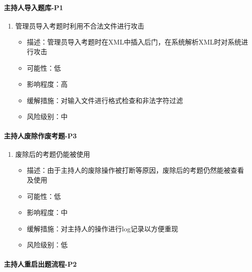 \documentclass[hyperref, a4paper]{ctexart}
\providecommand{\tightlist}{%
  \setlength{\itemsep}{0pt}\setlength{\parskip}{0pt}}
\let\oldparagraph\paragraph
\renewcommand{\paragraph}[1]{\oldparagraph{#1}\mbox{}}
\begin{document}
\hypertarget{ux4e3bux6301ux4ebaux5bfcux5165ux9898ux5e93-p1}{%
\paragraph{主持人导入题库-P1}\label{ux4e3bux6301ux4ebaux5bfcux5165ux9898ux5e93-p1}}

\begin{enumerate}
\def\labelenumi{\arabic{enumi}.}
\tightlist
\item
  管理员导入考题时利用不合法文件进行攻击

  \begin{itemize}
  \tightlist
  \item
    描述：管理员导入考题时在XML中插入后门，在系统解析XML时对系统进行攻击
  \item
    可能性：低
  \item
    影响程度：高
  \item
    缓解措施：对输入文件进行格式检查和非法字符过滤
  \item
    风险级别：中
  \end{itemize}
\end{enumerate}

\hypertarget{ux4e3bux6301ux4ebaux5e9fux9664ux4f5cux5e9fux8003ux9898-p3}{%
\paragraph{主持人废除作废考题-P3}\label{ux4e3bux6301ux4ebaux5e9fux9664ux4f5cux5e9fux8003ux9898-p3}}

\begin{enumerate}
\def\labelenumi{\arabic{enumi}.}
\tightlist
\item
  废除后的考题仍能被使用

  \begin{itemize}
  \tightlist
  \item
    描述：由于主持人的废除操作被打断等原因，废除后的考题仍然能被查看及使用
  \item
    可能性：低
  \item
    影响程度：中
  \item
    缓解措施：对主持人的操作进行log记录以方便重现
  \item
    风险级别：低
  \end{itemize}
\end{enumerate}

\hypertarget{ux4e3bux6301ux4ebaux91cdux542fux51faux9898ux6d41ux7a0b-p2}{%
\paragraph{主持人重启出题流程-P2}\label{ux4e3bux6301ux4ebaux91cdux542fux51faux9898ux6d41ux7a0b-p2}}
\end{document}
